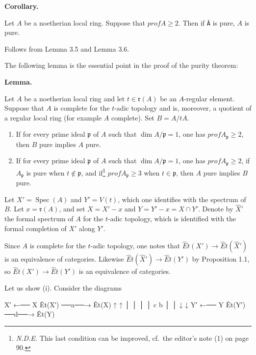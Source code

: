 \documentclass[
  11pt,
  a4paper,
]{book}
\newenvironment{Shaded}{}{}
\newcommand{\NormalTok}[1]{#1}
\providecommand{\tightlist}{%
  \setlength{\itemsep}{0pt}\setlength{\parskip}{0pt}}
\begin{document}
\textbf{Corollary.}

Let \(A\) be a noetherian local ring. Suppose that
\(prof A \geqslant 2\). Then if \texttt{Â} is pure, \(A\) is pure.

Follows from Lemma 3.5 and Lemma 3.6.

The following lemma is the essential point in the proof of the purity
theorem:

\textbf{Lemma.}

Let \(A\) be a noetherian local ring and let \(t \in \mathfrak{r}(A)\)
be an \(A\)-regular element. Suppose that \(A\) is complete for the
\(t\)-adic topology and is, moreover, a quotient of a regular local ring
(for example \(A\) complete). Set \(B = A/tA\).

\begin{enumerate}
\def\labelenumi{\arabic{enumi}.}
\tightlist
\item
  If for every prime ideal \(\mathfrak{p}\) of \(A\) such that
  \(\dim A/\mathfrak{p} = 1\), one has \(prof A_{\mathfrak{p}}
  \geqslant 2\), then \(B\) pure implies \(A\) pure.
\item
  If for every prime ideal \(\mathfrak{p}\) of \(A\) such that
  \(\dim A/\mathfrak{p} = 1\), one has \(prof A_{\mathfrak{p}}
  \geqslant 2\), if \(A_{\mathfrak{p}}\) is pure when
  \(t \notin \mathfrak{p}\), and if\footnote{\emph{N.D.E.} This last
    condition can be improved, cf.~the editor's note (1) on page 90.}
  \(prof A_{\mathfrak{p}}
  \geqslant 3\) when \(t \in \mathfrak{p}\), then \(A\) pure implies
  \(B\) pure.
\end{enumerate}

Let \(X' = \operatorname{Spec}(A)\) and \(Y' = V(t)\), which one
identifies with the spectrum of \(B\). Let \(x =
\mathfrak{r}(A)\), and set \(X = X' - {x}\) and
\(Y = Y' - {x} = X \cap Y'\). Denote by \(\hat{X}'\) the formal spectrum
of \(A\) for the \(t\)-adic topology, which is identified with the
formal completion of \(X'\) along \(Y'\).

Since \(A\) is complete for the \(t\)-adic topology, one notes that
\(\hat{E}t(X') \to \hat{E}t(\hat{X}')\) is an equivalence of categories.
Likewise \(\hat{E}t(\hat{X}') \to \hat{E}t(Y')\) by Proposition 1.1, so
\(\hat{E}t(X') \to \hat{E}t(Y')\) is an equivalence of categories.

Let us show (i). Consider the diagrams

\begin{Shaded}
\begin{Highlighting}[]
\NormalTok{   X′  ←──  X                    Êt(X′)  ──a──→  Êt(X)}
\NormalTok{   ↑        ↑                       │              │}
\NormalTok{   │        │                       c              b}
\NormalTok{   │        │                       ↓              ↓}
\NormalTok{   Y′  ←──  Y                    Êt(Y′)  ──d──→  Êt(Y)}
\end{Highlighting}
\end{Shaded}
\end{document}
